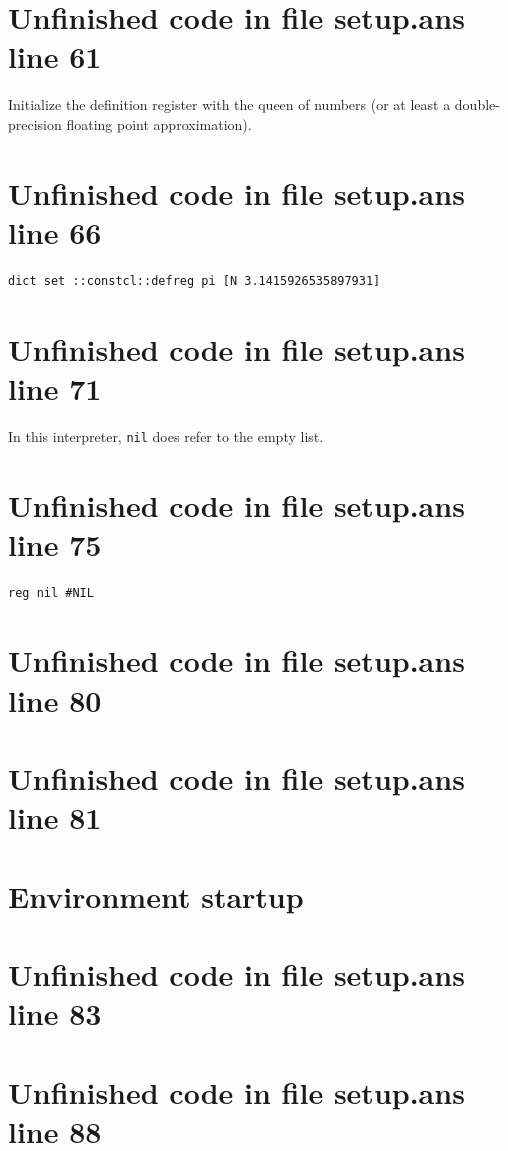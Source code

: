 \documentclass[twoside,9pt]{report}
\begin{document}
\section{Unfinished code in file setup.ans line 61}


Initialize the definition register with the queen of numbers (or at least a double-precision floating point approximation).

\section{Unfinished code in file setup.ans line 66}
\begin{lstlisting}
dict set ::constcl::defreg pi [N 3.1415926535897931]
\end{lstlisting}
\section{Unfinished code in file setup.ans line 71}


In this interpreter, \texttt{nil} does refer to the empty list.

\section{Unfinished code in file setup.ans line 75}
\begin{lstlisting}
reg nil #NIL
\end{lstlisting}
\section{Unfinished code in file setup.ans line 80}
\section{Unfinished code in file setup.ans line 81}
\section{Environment startup}
\label{environment-startup}
\section{Unfinished code in file setup.ans line 83}

\section{Unfinished code in file setup.ans line 88}
\end{document}
